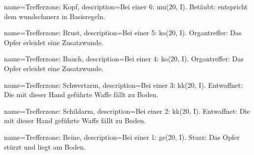 {
    name={Trefferzone: Kopf},
    description={Bei einer 6: \gls{mu}(20, I). Betäubt: entspricht dem \gls{wundschmerz} in Basisregeln.}}

{
    name={Trefferzone: Brust},
    description={Bei einer 5: \gls{ko}(20, I). Organtreffer: Das Opfer erleidet eine Zusatzwunde.}}

{
    name={Trefferzone: Bauch},
    description={Bei einer 4: \gls{ko}(20, I). Organtreffer: Das Opfer erleidet eine Zusatzwunde.}}

{
    name={Trefferzone: Schwertarm},
    description={Bei einer 3: \gls{kk}(20, I). Entwaffnet: Die mit dieser Hand geführte Waffe fällt zu Boden.}}

{
    name={Trefferzone: Schildarm},
    description={Bei einer 2: \gls{kk}(20, I). Entwaffnet: Die mit dieser Hand geführte Waffe fällt zu Boden.}}

{
    name={Trefferzone: Beine},
    description={Bei einer 1: \gls{ge}(20, I). Sturz: Das Opfer stürzt und liegt am Boden.}}